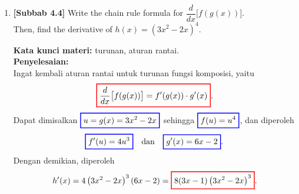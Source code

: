 \documentclass[10pt,openany,a4paper]{article}
\theoremstyle{definition}
\theoremstyle{definition}
\theoremstyle{plain}
\newenvironment{jawab}[2][tes]{%
\par\noindent\textbf{Kata kunci materi:} #1.\\
\textbf{Penyelesaian:} #2%
}{}
\begin{document}
\begin{enumerate}
    \item \textbf{[Subbab 4.4]} Write the chain rule formula for $\dfrac{d}{dx}\big[f(g(x))\big]$.\\
    Then, find the derivative of $h(x)=\left(3x^2-2x\right)^4$.
    \begin{jawab}[turunan, aturan rantai]{~\\
        Ingat kembali aturan rantai untuk turunan fungsi komposisi, yaitu
        \[
        \colorlet{oldcolor}{.}
        \color{red}
        \setlength{\fboxrule}{1pt} \boxed{\color{oldcolor}\frac{d}{dx}\big[f(g(x))\big] = f'(g(x)) \cdot g'(x)}\color{oldcolor}.
        \]
        Dapat dimisalkan $\colorlet{oldcolor}{.}
        \color{blue}
        \setlength{\fboxrule}{1pt} \boxed{\color{oldcolor}u=g(x)=3x^2-2x}\color{oldcolor}$ sehingga $\colorlet{oldcolor}{.}
        \color{blue}
        \setlength{\fboxrule}{1pt} \boxed{\color{oldcolor}f(u)=u^4}\color{oldcolor}$, dan diperoleh
        \begin{align*}
            \colorlet{oldcolor}{.}
        \color{blue}
        \setlength{\fboxrule}{1pt} \boxed{\color{oldcolor}f'(u)=4u^3}\color{oldcolor} \quad\text{dan}\quad \colorlet{oldcolor}{.}
        \color{blue}
        \setlength{\fboxrule}{1pt} \boxed{\color{oldcolor}g'(x)=6x-2}\color{oldcolor}.
        \end{align*}
        Dengan demikian, diperoleh
        \begin{align*}
            h'(x) = 4\left(3x^2-2x\right)^3(6x-2) = \colorlet{oldcolor}{.}
        \color{red}
        \setlength{\fboxrule}{1pt} \boxed{\color{oldcolor}8(3x-1)\left(3x^2-2x\right)^3}\color{oldcolor}.
        \end{align*}
    }
    \end{jawab}


\end{enumerate}
\end{document}
